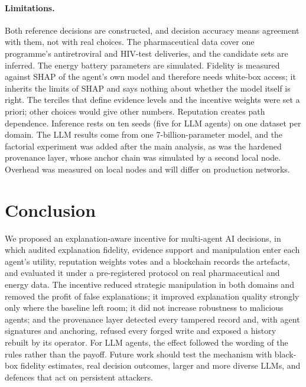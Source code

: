 \documentclass[pdflatex,sn-basic]{sn-jnl}
\begin{document}
\paragraph{Limitations.} Both reference decisions are constructed, and decision accuracy means
agreement with them, not with real choices. The pharmaceutical data cover one programme's
antiretroviral and HIV-test deliveries, and the candidate sets are inferred. The energy
battery parameters are simulated. Fidelity is measured against SHAP of the agent's own model
and therefore needs white-box access; it inherits the limits of SHAP and says nothing about
whether the model itself is right. The terciles that define evidence levels and the incentive
weights were set a priori; other choices would give other numbers. Reputation creates path
dependence. Inference rests on ten seeds (five for LLM agents) on one dataset per domain. The
LLM results come from one 7-billion-parameter model, and the factorial experiment was added
after the main analysis, as was the hardened provenance layer, whose anchor chain was simulated
by a second local node. Overhead was measured on local nodes and will differ on production
networks.

\section{Conclusion}\label{sec:conclusion}

We proposed an explanation-aware incentive for multi-agent AI decisions, in which audited
explanation fidelity, evidence support and manipulation enter each agent's utility,
reputation weights votes and a blockchain records the artefacts, and evaluated it under a
pre-registered protocol on real pharmaceutical and energy data. The incentive reduced
strategic manipulation in both domains and removed the profit of false explanations; it
improved explanation quality strongly only where the baseline left room; it did not increase
robustness to malicious agents; and the provenance layer detected every tampered record and,
with agent signatures and anchoring, refused every forged write and exposed a history rebuilt
by its operator. For
LLM agents, the effect followed the wording of the rules rather than the payoff. Future work
should test the mechanism with black-box fidelity estimates, real decision outcomes, larger
and more diverse LLMs, and defences that act on persistent attackers.

\backmatter
\end{document}
